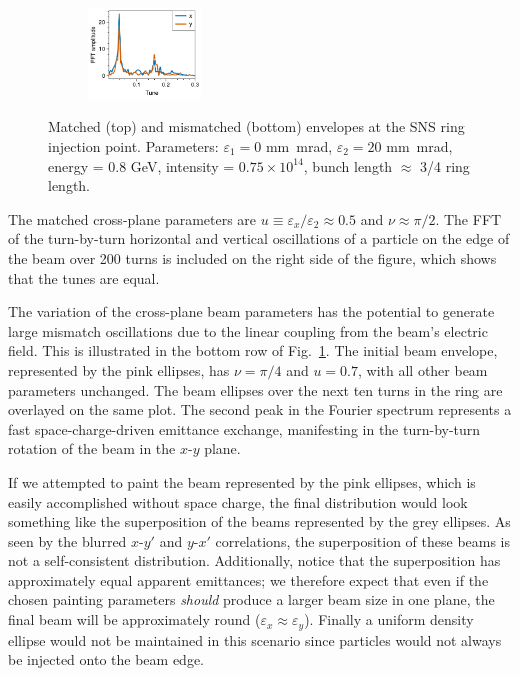 \begin{figure}[!p]
\begin{subfigure}[b]{\textwidth}
        \includegraphics[width=0.33\textwidth, valign=t]{Images/chapter2/mismatched_env_SNS_fft.pdf}
    \end{subfigure}
    \caption{Matched (top) and mismatched (bottom) envelopes at the SNS ring injection point. Parameters: $\varepsilon_1 = 0$ mm~mrad, $\varepsilon_2 = 20$ mm~mrad, energy = 0.8 GeV, intensity = $0.75 \times 10^{14}$, bunch length $\approx$ 3/4 ring length.}
    \label{fig:matched_env_SNS}
\end{figure}
%
The matched cross-plane parameters are $u \equiv \varepsilon_x / \varepsilon_2 \approx 0.5$ and $\nu \approx \pi / 2$. The FFT of the turn-by-turn horizontal and vertical oscillations of a particle on the edge of the beam over 200 turns is included on the right side of the figure, which shows that the tunes are equal. 

The variation of the cross-plane beam parameters has the potential to generate large mismatch oscillations due to the linear coupling from the beam's electric field. This is illustrated in the bottom row of Fig.~\ref{fig:matched_env_SNS}. The initial beam envelope, represented by the pink ellipses, has $\nu = \pi / 4$ and $u = 0.7$, with all other beam parameters unchanged. The beam ellipses over the next ten turns in the ring are overlayed on the same plot. The second peak in the Fourier spectrum represents a fast space-charge-driven emittance exchange, manifesting in the turn-by-turn rotation of the beam in the $x$-$y$ plane. 

If we attempted to paint the beam represented by the pink ellipses, which is easily accomplished without space charge, the final distribution would look something like the superposition of the beams represented by the grey ellipses. As seen by the blurred $x$-$y'$ and $y$-$x'$ correlations, the superposition of these beams is not a self-consistent distribution. Additionally, notice that the superposition has approximately equal apparent emittances; we therefore expect that even if the chosen painting parameters \textit{should} produce a larger beam size in one plane, the final beam will be approximately round ($\varepsilon_x \approx \varepsilon_y$). Finally a uniform density ellipse would not be maintained in this scenario since particles would not always be injected onto the beam edge. 

